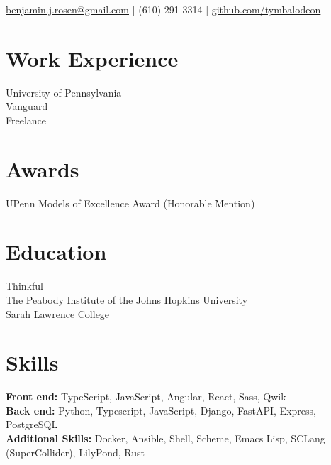 \documentclass{article}
\begin{document}

\small{
  \underline{benjamin.j.rosen@gmail.com}
}
$|$
\small{(610) 291-3314}
$|$
\small{
  \underline{github.com/tymbalodeon}
}

\section{Work Experience}

University of Pennsylvania \\
Vanguard \\
Freelance \\

\section{Awards}

UPenn Models of Excellence Award (Honorable Mention)

\section{Education}

Thinkful \\
The Peabody Institute of the Johns Hopkins University \\
Sarah Lawrence College

\section{Skills}

\textbf{Front end:} TypeScript, JavaScript, Angular, React, Sass, Qwik \\
\textbf{Back end:} Python, Typescript, JavaScript, Django, FastAPI, Express,
  PostgreSQL \\
\textbf{Additional Skills:} Docker, Ansible, Shell, Scheme, Emacs Lisp, SCLang
  (SuperCollider), LilyPond, Rust
\end{document}
